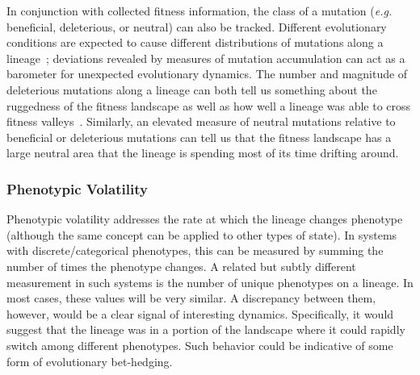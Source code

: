 \documentclass[letterpaper]{article}
\begin{document}
In conjunction with collected fitness information, the class of a mutation (\textit{e.g.} beneficial, deleterious, or neutral) can also be tracked. Different evolutionary conditions are expected to cause different distributions of mutations along a lineage~\citep{barrick2013genome}; deviations revealed by measures of mutation accumulation can act as a barometer for unexpected evolutionary dynamics.  
The number and magnitude of deleterious mutations along a lineage can both tell us something about the ruggedness of the fitness landscape as well as how well a lineage was able to cross fitness valleys~\citep{covert_experiments_2013}. 
Similarly, an elevated measure of neutral mutations relative to beneficial or deleterious mutations can tell us that the fitness landscape has a large neutral area that the lineage is spending most of its time drifting around. 




\subsubsection{Phenotypic Volatility}

Phenotypic volatility addresses the rate at which the lineage changes phenotype (although the same concept can be applied to other types of state). In systems with discrete/categorical phenotypes, this can be measured by summing the number of times the phenotype changes. A related but subtly different measurement in such systems is the number of unique phenotypes on a lineage. In most cases, these values will be very similar. A discrepancy between them, however, would be a clear signal of interesting dynamics. Specifically, it would suggest that the lineage was in a portion of the landscape where it could rapidly switch among different phenotypes. Such behavior could be indicative of some form of evolutionary bet-hedging.
\end{document}
